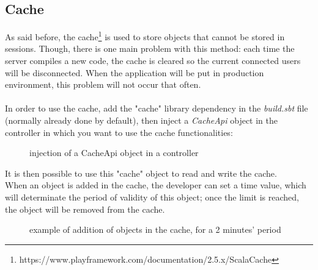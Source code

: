 \documentclass[a4paper,11pt]{report}
\begin{document}
\subsection{Cache}
\label{cache}
As said before, the cache\footnote{https://www.playframework.com/documentation/2.5.x/ScalaCache} is used to store objects that cannot be stored in sessions. Though, there is one main problem with this method: each time the server compiles a new code, the cache is cleared so the current connected users will be disconnected. When the application will be put in production environment, this problem will not occur that often.\\\\
In order to use the cache, add the "cache" library dependency in the \emph{build.sbt} file (normally already done by default), then inject a \emph{CacheApi} object in the controller in which you want to use the cache functionalities:
\begin{figure}[H]
\vspace{-5pt}
\begin{center}
\vspace{-20pt}
\caption{injection of a CacheApi object in a controller}
\end{center}
\end{figure}
\vspace{-10pt}

It is then possible to use this "cache" object to read and write the cache.\\
When an object is added in the cache, the developer can set a time value, which will determinate the period of validity of this object; once the limit is reached, the object will be removed from the cache.
\begin{figure}[H]
\vspace{-5pt}
\begin{center}
\vspace{-5pt}
\caption{example of addition of objects in the cache, for a 2 minutes' period}
\end{center}
\end{figure}
\vspace{-10pt}
\end{document}
